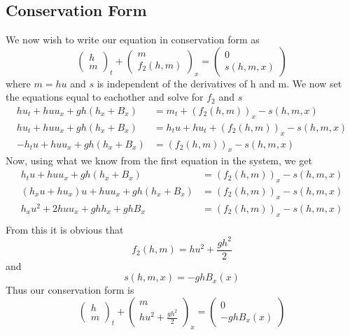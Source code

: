 \subsection{Conservation Form}
We now wish to write our equation in conservation form as 
$$\begin{pmatrix}
h\\m	
\end{pmatrix}_t + \begin{pmatrix}
m\\ f_2(h,m)
\end{pmatrix}_x = \begin{pmatrix}
0\\s(h,m,x)
\end{pmatrix}$$
where $m=hu$ and $s$ is independent of the derivatives of h and m. We now set the equations equal to eachother and solve for $f_2$ and $s$
\begin{align*}
hu_t+huu_x + gh(h_x+B_x)&=m_t+(f_2(h,m))_x - s(h,m,x) \\
hu_t+huu_x + gh(h_x+B_x)&=h_tu+hu_t+(f_2(h,m))_x - s(h,m,x) \\
-h_tu+huu_x + gh(h_x+B_x)&=(f_2(h,m))_x - s(h,m,x)
\end{align*}
Now, using what we know from the first equation in the system, we get
\begin{align*}
h_tu+huu_x + gh(h_x+B_x)&=(f_2(h,m))_x - s(h,m,x) \\
(h_x u+hu_x)u+huu_x + gh(h_x+B_x)&=(f_2(h,m))_x - s(h,m,x) \\
h_x u^2+2huu_x + ghh_x+ghB_x &=(f_2(h,m))_x - s(h,m,x) \\
\end{align*}
From this it is obvious that
$$f_2(h,m)=h u^2 + \frac{gh^2}{2}$$ and
$$s(h,m,x)=-ghB_x(x)$$
Thus our conservation form is 
$$\begin{pmatrix}
h\\m	
\end{pmatrix}_t + \begin{pmatrix}
m\\ h u^2 + \frac{gh^2}{2}
\end{pmatrix}_x = \begin{pmatrix}
0\\-ghB_x(x)
\end{pmatrix}$$
